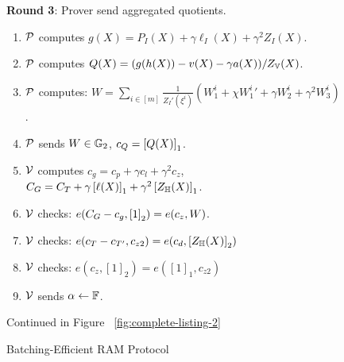 \begin{figure}[t!]
\begin{mdframed}
        {\bf Round 3}: Prover send aggregated quotients.
        \begin{enumerate}[leftmargin=1em, label=\arabic*.]
            \item $\mathcal{P}$ computes $g(X)=P_I(X) + \gamma \ell_I(X) + \gamma^2 Z_I(X)$.
            \item $\mathcal{P}$ computes $Q(X) = (g(h(X)) - v(X) -\gamma a(X))/Z_{\mathbb{V}}(X)$.
            \item $\mathcal{P}$ computes: $W = \sum_{i\in [m]} \frac{1}{Z_I'(\xi^i)} (W_1^i + \chi {W_1^i}' + \gamma W_2^i + \gamma^2 W_3^i)$.
            \item $\mathcal{P}$ sends $W\in \mathbb{G}_2$, $c_Q=\left[{Q(X)}\right]_1$.
            \item $\mathcal{V}$ computes $c_g = c_p + \gamma c_l + \gamma^2 c_z$, $C_G = C_T + \gamma\left[{\ell(X)}\right]_1+\gamma^2\left[{Z_\mathbb{H}(X)}\right]_1$.
            \item $\mathcal{V}$ checks: $e(C_G - c_g, \left[{1}\right]_2)=e(c_z, W)$.
            \item $\mathcal{V}$ checks: $e(c_T-c_{T'}, c_{z2})=e(c_d, \left[{Z_\mathbb{H}(X)}\right]_2)$
            \item $\mathcal{V}$ checks: $e(c_z, [1]_2)=e([1]_1, c_{z2})$
            \item $\mathcal{V}$ sends $\alpha\gets \mathbb{F}$.
        \end{enumerate}

        Continued in Figure ~\ref{fig:complete-listing-2}
    \end{mdframed}
    \caption{Batching-Efficient RAM Protocol}
    \label{fig:complete-listing}
\end{figure}

